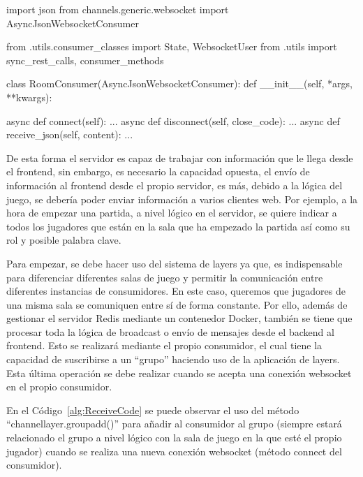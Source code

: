 \begin{mypython}[float={h},caption={RoomConsumer},label={alg:RoomConsumer}]
	import json
	from channels.generic.websocket import AsyncJsonWebsocketConsumer
																																																	
	from .utils.consumer_classes import State, WebsocketUser
	from .utils import sync_rest_calls, consumer_methods
	
	class RoomConsumer(AsyncJsonWebsocketConsumer):
	def __init__(self, *args, **kwargs):
																																																	
	async def connect(self): ...																																			
	async def disconnect(self, close_code):	...																																			
	async def receive_json(self, content): ...	
\end{mypython}

De esta forma el servidor es capaz de trabajar con información que le llega desde el frontend, sin embargo, es necesario la capacidad opuesta, el envío de información al 
frontend desde el propio servidor, es más, debido a la lógica del juego, se debería poder enviar información a varios clientes web. Por ejemplo, a la hora de empezar una partida,
a nivel lógico en el servidor, se quiere indicar a todos los jugadores que están en la sala que ha empezado la partida así como su rol y posible palabra clave.

Para empezar, se debe hacer uso del sistema de layers ya que, es indispensable para diferenciar diferentes salas de juego y permitir 
la comunicación entre diferentes instancias de consumidores. En este caso, queremos que jugadores de una misma sala se comuniquen entre sí de forma constante. 
Por ello, además de gestionar el servidor Redis mediante un contenedor Docker, también se tiene que procesar toda la lógica de broadcast
o envío de mensajes desde el backend al frontend. Esto se realizará mediante el propio consumidor, el cual tiene la capacidad de suscribirse a un ``grupo'' haciendo uso
de la aplicación de layers. Esta última operación se debe realizar cuando se acepta una conexión websocket en el propio consumidor. 

En el Código~\ref{alg:ReceiveCode} se puede observar el uso del método ``channel\textunderscore layer.group\textunderscore add()'' para añadir al consumidor
al grupo (siempre estará relacionado el grupo a nivel lógico con la sala de juego en la que esté el propio jugador) cuando se realiza una nueva conexión websocket (método connect del consumidor). 

